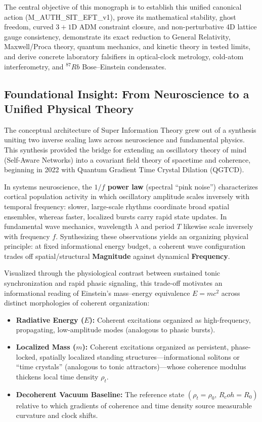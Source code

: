 \documentclass[american,11pt,letterpaper]{article}
\newcommand{\Rcoh}{R_{\mathrm{coh}}}
\def\mathrm#1{#1}%
\def\texttt#1{#1}%
\def\emph#1{#1}%
\def\Rcoh{R_coh}%
\begin{document}
The central objective of this monograph is to establish this unified canonical action (\texttt{M\_AUTH\_SIT\_EFT\_v1}), prove its mathematical stability, ghost freedom, curved $3+1$D ADM constraint closure, and non-perturbative 4D lattice gauge consistency, demonstrate its exact reduction to General Relativity, Maxwell/Proca theory, quantum mechanics, and kinetic theory in tested limits, and derive concrete laboratory falsifiers in optical-clock metrology, cold-atom interferometry, and $^{87}\mathrm{Rb}$ Bose--Einstein condensates.

\subsection{Foundational Insight: From Neuroscience to a Unified Physical Theory}

The conceptual architecture of Super Information Theory grew out of a synthesis uniting two inverse scaling laws across neuroscience and fundamental physics. This synthesis provided the bridge for extending an oscillatory theory of mind (\emph{Self-Aware Networks}) into a covariant field theory of spacetime and coherence, beginning in 2022 with \emph{Quantum Gradient Time Crystal Dilation (QGTCD)}.

In systems neuroscience, the \textbf{$1/f$ power law} (spectral ``pink noise'') characterizes cortical population activity in which oscillatory amplitude scales inversely with temporal frequency: slower, large-scale rhythms coordinate broad spatial ensembles, whereas faster, localized bursts carry rapid state updates. In fundamental wave mechanics, wavelength $\lambda$ and period $T$ likewise scale inversely with frequency $f$. Synthesizing these observations yields an organizing physical principle: at fixed informational energy budget, a coherent wave configuration trades off spatial/structural \textbf{Magnitude} against dynamical \textbf{Frequency}.

Visualized through the physiological contrast between sustained tonic synchronization and rapid phasic signaling, this trade-off motivates an informational reading of Einstein's mass--energy equivalence $E = mc^2$ across distinct morphologies of coherent organization:
\begin{itemize}
  \item \textbf{Radiative Energy ($E$):} Coherent excitations organized as high-frequency, propagating, low-amplitude modes (analogous to phasic bursts).
  \item \textbf{Localized Mass ($m$):} Coherent excitations organized as persistent, phase-locked, spatially localized standing structures---informational solitons or ``time crystals'' (analogous to tonic attractors)---whose coherence modulus thickens local time density $\rho_t$.
  \item \textbf{Decoherent Vacuum Baseline:} The reference state $(\rho_t = \rho_0,\, \Rcoh = R_0)$ relative to which gradients of coherence and time density source measurable curvature and clock shifts.
\end{itemize}
\end{document}
